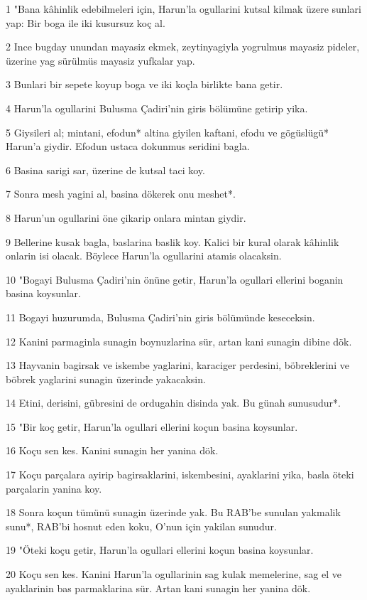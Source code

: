 \par 1 "Bana kâhinlik edebilmeleri için, Harun'la ogullarini kutsal kilmak üzere sunlari yap: Bir boga ile iki kusursuz koç al.
\par 2 Ince bugday unundan mayasiz ekmek, zeytinyagiyla yogrulmus mayasiz pideler, üzerine yag sürülmüs mayasiz yufkalar yap.
\par 3 Bunlari bir sepete koyup boga ve iki koçla birlikte bana getir.
\par 4 Harun'la ogullarini Bulusma Çadiri'nin giris bölümüne getirip yika.
\par 5 Giysileri al; mintani, efodun* altina giyilen kaftani, efodu ve gögüslügü* Harun'a giydir. Efodun ustaca dokunmus seridini bagla.
\par 6 Basina sarigi sar, üzerine de kutsal taci koy.
\par 7 Sonra mesh yagini al, basina dökerek onu meshet*.
\par 8 Harun'un ogullarini öne çikarip onlara mintan giydir.
\par 9 Bellerine kusak bagla, baslarina baslik koy. Kalici bir kural olarak kâhinlik onlarin isi olacak. Böylece Harun'la ogullarini atamis olacaksin.
\par 10 "Bogayi Bulusma Çadiri'nin önüne getir, Harun'la ogullari ellerini boganin basina koysunlar.
\par 11 Bogayi huzurumda, Bulusma Çadiri'nin giris bölümünde keseceksin.
\par 12 Kanini parmaginla sunagin boynuzlarina sür, artan kani sunagin dibine dök.
\par 13 Hayvanin bagirsak ve iskembe yaglarini, karaciger perdesini, böbreklerini ve böbrek yaglarini sunagin üzerinde yakacaksin.
\par 14 Etini, derisini, gübresini de ordugahin disinda yak. Bu günah sunusudur*.
\par 15 "Bir koç getir, Harun'la ogullari ellerini koçun basina koysunlar.
\par 16 Koçu sen kes. Kanini sunagin her yanina dök.
\par 17 Koçu parçalara ayirip bagirsaklarini, iskembesini, ayaklarini yika, basla öteki parçalarin yanina koy.
\par 18 Sonra koçun tümünü sunagin üzerinde yak. Bu RAB'be sunulan yakmalik sunu*, RAB'bi hosnut eden koku, O'nun için yakilan sunudur.
\par 19 "Öteki koçu getir, Harun'la ogullari ellerini koçun basina koysunlar.
\par 20 Koçu sen kes. Kanini Harun'la ogullarinin sag kulak memelerine, sag el ve ayaklarinin bas parmaklarina sür. Artan kani sunagin her yanina dök.
